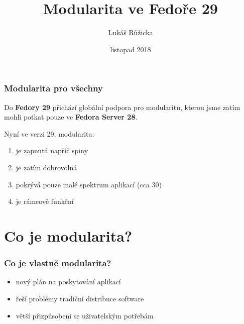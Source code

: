 \documentclass[12pt]{beamer}
\begin{document}
	\author{Lukáš Růžicka}
	\title{Modularita ve Fedoře 29}
	\subtitle{}
	\date{listopad 2018}
	\subject{Fedora 29}
	\begin{frame}[plain]
	\maketitle
\end{frame}

\begin{frame}
\frametitle{Modularita pro všechny}
Do \textbf{Fedory 29} přichází globální podpora pro modularitu, kterou jsme zatím mohli potkat pouze ve \textbf{Fedora Server 28}. 

Nyní ve verzi 29, modularita:

\vspace{5pt}

\begin{enumerate}
	\item je zapnutá napříč spiny
	\item je zatím dobrovolná
	\item pokrývá pouze malé spektrum aplikací (cca 30)
	\item je rámcově funkční
\end{enumerate}	
\end{frame}


\section{Co je modularita?}

\begin{frame}
\frametitle{Co je vlastně modularita?}


\begin{itemize}
	\item nový plán na poskytování aplikací
	\item řeší problémy tradiční distribuce software
	\item větší přizpůsobení se uživatelským potřebám
\end{itemize}

\end{frame}
\end{document}

